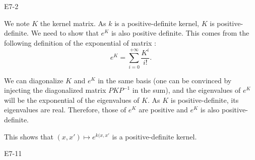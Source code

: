 \begin{questions}
    \question E7-2

    \begin{solution}
        We note $K$ the kernel matrix. As $k$ is a positive-definite kernel, $K$ is positive-definite. We need to show that $e^K$ is also positive definite. This comes from the following definition of the exponential of matrix : $$e^K = \sum_{i=0}^{+\infty} \frac{K^i}{i!}.$$

        We can diagonalize $K$ and $e^K$ in the same basis (one can be convinced by injecting the diagonalized matrix $PKP^{-1}$ in the sum), and the eigenvalues of $e^K$ will be the exponential of the eigenvalues of $K$. As $K$ is positive-definite, its eigenvalues are real. Therefore, those of $e^K$ are positive and $e^K$ is also positive-definite.

        This shows that $(x, x') \mapsto e^{k(x, x'}$ is a positive-definite kernel.
    \end{solution}

    \question E7-11

    \begin{solution}
\end{solution}
\end{questions}
